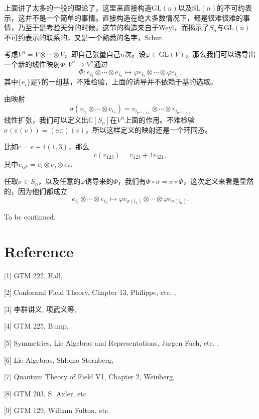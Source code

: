\documentclass[9pt]{extarticle}
\newcommand{\cc}{\mathbb{C}}
\begin{document}
上面讲了太多的一般的理论了，这里来直接构造$\mathrm{GL}(n)$以及$\mathrm{SL}(n)$的不可约表示，这并不是一个简单的事情。直接构造在绝大多数情况下，都是很难很难的事情，乃至于是考验天分的时候。这节的构造来自于Weyl，而揭示了$S_n$与$\mathrm{GL}(n)$不可约表示的联系的，又是一个熟悉的名字，Schur.

\para 考虑$V^n=V\otimes\cdots \otimes V$，即自己张量自己$n$次。设$\varphi\in \mathrm{GL}(V)$，那么我们可以诱导出一个新的线性映射$\Phi:V^n\to V^n$通过
\[
	\Phi : e_{i_1}\otimes\cdots\otimes e_{i_n}\mapsto \varphi e_{i_1}\otimes\cdots\otimes \varphi e_{i_n},
\]
其中$\{e_i\}$是$V$的一组基，不难检验，上面的诱导并不依赖于基的选取。

\para 由映射
\[
	\sigma(v_{i_1}\otimes\cdots\otimes v_{i_n})=v_{i_{\sigma^{-1}(1)}}\otimes\cdots\otimes v_{i_{\sigma^{-1}(n)}}
\]
线性扩张，我们可以定义出$\cc [S_n]$在$V^n$上面的作用。不难检验$\sigma(\pi(v))=(\sigma\pi)(v)$，所以这样定义的映射还是一个环同态。

比如$c=e+4(1,3)$，那么
\[
	c(v_{123})=v_{123}+4v_{321},
\]
其中$v_{ijk}=e_{i}\otimes e_{j}\otimes e_{k}$.

\para 任取$\sigma\in S_n$，以及任意的$\varphi$诱导来的$\Phi$，我们有$\Phi\circ \sigma=\sigma\circ \Phi$，这次定义来看是显然的，因为他们都成立
\[
	e_{i_1}\otimes\cdots\otimes e_{i_n}\mapsto \varphi e_{\sigma(i_1)}\otimes\cdots\otimes \varphi e_{\sigma(i_n)}.
\]

To be continued.

\clearpage

\section*{Reference}

[1] GTM 222, Hall,

[2] Conforaml Field Theory, Chapter 13, Philippe, etc. ,

[3] 李群讲义, 项武义等, 

[4] GTM 225, Bump,

[5] Symmetries, Lie Algebras and Representations, Jurgen Fuch, etc. ,

[6] Lie Algebras, Shlomo Sternberg,

[7] Quantum Theory of Field V1, Chapter 2, Weinberg,

[8] GTM 203, S. Axler, etc.

[9] GTM 129, William Fulton, etc.
\end{document}
